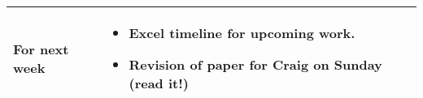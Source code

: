 \documentclass[a4wide,10pt]{extarticle}
\begin{document}
\begin{center}
\begin{tabular}{| m{3.0cm} | m{12.6cm} | m{2cm}|}
For next week &
	\begin{itemize}
		\item Excel timeline for upcoming work.
		\item Revision of paper for Craig on Sunday (read it!)
	\end{itemize}
\\ \hline


\end{tabular}
\end{center}
\end{document}
